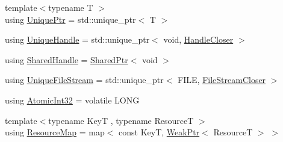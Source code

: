 \begin{DoxyCompactItemize}
\item 
{\footnotesize template$<$typename T $>$ }\\using \hyperlink{namespacemage_a8c307fbcc33bce9b7f2aa4c26c3b95cf}{Unique\+Ptr} = std\+::unique\+\_\+ptr$<$ T $>$
\item 
using \hyperlink{namespacemage_a71b57b9dc2b47346aac2d355fb98a3d2}{Unique\+Handle} = std\+::unique\+\_\+ptr$<$ void, \hyperlink{structmage_1_1_handle_closer}{Handle\+Closer} $>$
\item 
using \hyperlink{namespacemage_ae70b3368a2dccc985c4ecbdf15a1a3c9}{Shared\+Handle} = \hyperlink{namespacemage_a1e01ae66713838a7a67d30e44c67703e}{Shared\+Ptr}$<$ void $>$
\item 
using \hyperlink{namespacemage_a4250d57cb76846bd81137e496ca41148}{Unique\+File\+Stream} = std\+::unique\+\_\+ptr$<$ F\+I\+LE, \hyperlink{structmage_1_1_file_stream_closer}{File\+Stream\+Closer} $>$
\item 
using \hyperlink{namespacemage_a37ac3b8da2d89495d105e00f1022cb1e}{Atomic\+Int32} = volatile L\+O\+NG
\item 
{\footnotesize template$<$typename KeyT , typename ResourceT $>$ }\\using \hyperlink{namespacemage_a3aaea9153b9e896914d7a1155d8c7bbe}{Resource\+Map} = map$<$ const KeyT, \hyperlink{namespacemage_aa159a63c0d58464bdf32dfe419dd5dc1}{Weak\+Ptr}$<$ ResourceT $>$ $>$
\end{DoxyCompactItemize}
